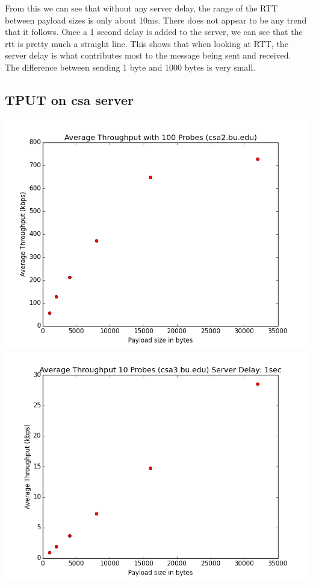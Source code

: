 \documentclass[11pt]{article}
\theoremstyle{definition}
\begin{document}
From this we can see that without any server delay, the range of the RTT between payload sizes is only about 10ms.  There does not appear to be any trend that it follows.  Once a 1 second delay is added to the server, we can see that the rtt is pretty much a straight line.  This shows that when looking at RTT, the server delay is what contributes most to the message being sent and received.  The difference between sending 1 byte and 1000 bytes is very small.

\subsection*{TPUT on csa server}
\includegraphics[scale=0.4]{tput_csa}
\includegraphics[scale=0.4]{tput_csa_sd1}
\end{document}

